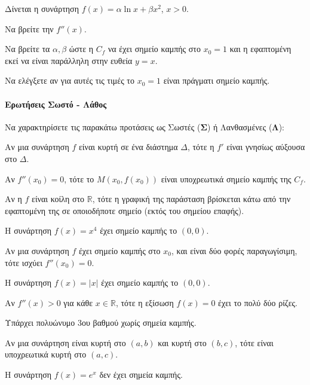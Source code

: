 \documentclass[11pt,a4paper,modern]{FFExercises}
\begin{document}
\askhsh
Δίνεται η συνάρτηση $f(x) = \alpha \ln x + \beta x^2$, $x>0$.
\begin{alist}
    \item Να βρείτε την $f''(x)$.
    \item Να βρείτε τα $\alpha, \beta$ ώστε η $C_f$ να έχει σημείο καμπής στο $x_0=1$ και η εφαπτομένη εκεί να είναι παράλληλη στην ευθεία $y=x$.
    \item Να ελέγξετε αν για αυτές τις τιμές το $x_0=1$ είναι πράγματι σημείο καμπής.
\end{alist}

\paragraph{Ερωτήσεις Σωστό - Λάθος}

\askhsh
Να χαρακτηρίσετε τις παρακάτω προτάσεις ως Σωστές (\textbf{Σ}) ή Λανθασμένες (\textbf{Λ}):
\begin{alist}
    \item Αν μια συνάρτηση $f$ είναι κυρτή σε ένα διάστημα $\Delta$, τότε η $f'$ είναι γνησίως αύξουσα στο $\Delta$.
    \item Αν $f''(x_0)=0$, τότε το $M(x_0, f(x_0))$ είναι υποχρεωτικά σημείο καμπής της $C_f$.
    \item Αν η $f$ είναι κοίλη στο $\mathbb{R}$, τότε η γραφική της παράσταση βρίσκεται κάτω από την εφαπτομένη της σε οποιοδήποτε σημείο (εκτός του σημείου επαφής).
    \item Η συνάρτηση $f(x)=x^4$ έχει σημείο καμπής το $(0,0)$.
    \item Αν μια συνάρτηση $f$ έχει σημείο καμπής στο $x_0$, και είναι δύο φορές παραγωγίσιμη, τότε ισχύει $f''(x_0)=0$.
    \item Η συνάρτηση $f(x) = |x|$ έχει σημείο καμπής το $(0,0)$.
    \item Αν $f''(x) > 0$ για κάθε $x \in \mathbb{R}$, τότε η εξίσωση $f(x)=0$ έχει το πολύ δύο ρίζες.
    \item Υπάρχει πολυώνυμο 3ου βαθμού χωρίς σημεία καμπής.
    \item Αν μια συνάρτηση είναι κυρτή στο $(a,b)$ και κυρτή στο $(b,c)$, τότε είναι υποχρεωτικά κυρτή στο $(a,c)$.
    \item Η συνάρτηση $f(x)=e^x$ δεν έχει σημεία καμπής.
\end{alist}
\end{document}
